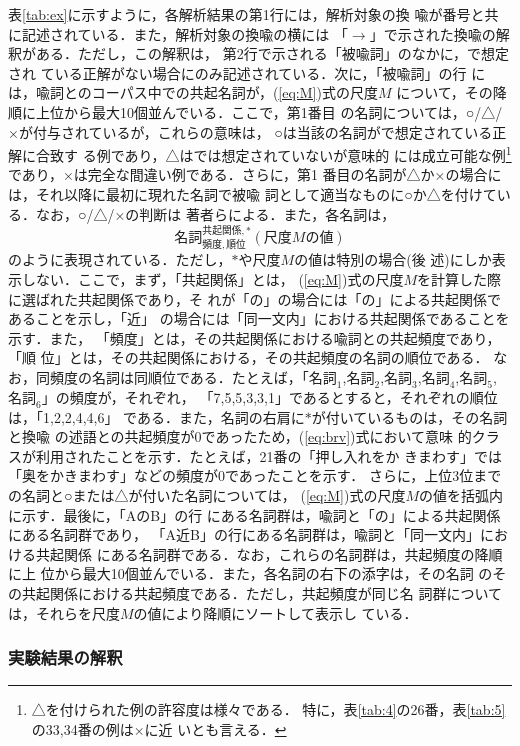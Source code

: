表\ref{tab:ex}に示すように，各解析結果の第1行には，解析対象の換
喩が番号と共に記述されている．また，解析対象の換喩の横には
「$\rightarrow$」で示された換喩の解釈がある．ただし，この解釈は，
第2行で示される「被喩詞」のなかに，\cite{yamanashi88}で想定され
ている正解がない場合にのみ記述されている．次に，「被喩詞」の行
には，喩詞とのコーパス中での共起名詞が，(\ref{eq:M})式の尺度$M$
について，その降順に上位から最大10個並んでいる．ここで，第1番目
の名詞については，○/△/×が付与されているが，これらの意味は，
○は当該の名詞が\cite{yamanashi88}で想定されている正解に合致す
る例であり，△は\cite{yamanashi88}では想定されていないが意味的
には成立可能な例\footnote{△を付けられた例の許容度は様々である．
  特に，表\ref{tab:4}の26番，表\ref{tab:5}の33,34番の例は×に近
  いとも言える．}であり，×は完全な間違い例である．さらに，第1
番目の名詞が△か×の場合には，それ以降に最初に現れた名詞で被喩
詞として適当なものに○か△を付けている．なお，○/△/×の判断は
著者らによる．また，各名詞は，
\begin{displaymath}
  名詞^{共起関係,*}_{頻度,順位}(尺度Mの値)
\end{displaymath}
のように表現されている．ただし，$*$や尺度$M$の値は特別の場合(後
述)にしか表示しない．ここで，まず，「共起関係」とは，
(\ref{eq:M})式の尺度$M$を計算した際に選ばれた共起関係であり，そ
れが「の」の場合には「の」による共起関係であることを示し，「近」
の場合には「同一文内」における共起関係であることを示す．また，
「頻度」とは，その共起関係における喩詞との共起頻度であり，「順
位」とは，その共起関係における，その共起頻度の名詞の順位である．
なお，同頻度の名詞は同順位である．たとえば，「$名詞_1$,$名詞_
2$,$名詞_ 3$,$名詞_ 4$,$名詞_5$,$名詞_6$」の頻度が，それぞれ，
「7,5,5,3,3,1」であるとすると，それぞれの順位は，「1,2,2,4,4,6」
である．また，名詞の右肩に$*$が付いているものは，その名詞と換喩
の述語との共起頻度が0であったため，(\ref{eq:brv})式において意味
的クラスが利用されたことを示す．たとえば，21番の「押し入れをか
きまわす」では「奥をかきまわす」などの頻度が0であったことを示す．
さらに，上位3位までの名詞と○または△が付いた名詞については，
(\ref{eq:M})式の尺度$M$の値を括弧内に示す．最後に，「AのB」の行
にある名詞群は，喩詞と「の」による共起関係にある名詞群であり，
「A近B」の行にある名詞群は，喩詞と「同一文内」における共起関係
にある名詞群である．なお，これらの名詞群は，共起頻度の降順に上
位から最大10個並んでいる．また，各名詞の右下の添字は，その名詞
のその共起関係における共起頻度である．ただし，共起頻度が同じ名
詞群については，それらを尺度$M$の値により降順にソートして表示し
ている．

\subsubsection{実験結果の解釈}

